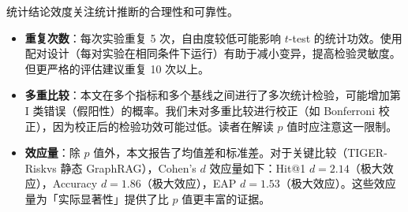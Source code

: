\documentclass[12pt,a4paper]{article}
\newcommand{\projectshort}{TIGER-Risk}
\newcommand{\term}[1]{\textbf{#1}}
\begin{document}
统计结论效度关注统计推断的合理性和可靠性。

\begin{itemize}
    \item \term{重复次数}：每次实验重复 5 次，自由度较低可能影响 $t$-test 的统计功效。使用配对设计（每对实验在相同条件下运行）有助于减小变异，提高检验灵敏度。但更严格的评估建议重复 10 次以上。
    \item \term{多重比较}：本文在多个指标和多个基线之间进行了多次统计检验，可能增加第 I 类错误（假阳性）的概率。我们未对多重比较进行校正（如 Bonferroni 校正），因为校正后的检验功效可能过低。读者在解读 $p$ 值时应注意这一限制。
    \item \term{效应量}：除 $p$ 值外，本文报告了均值差和标准差。对于关键比较（\projectshort vs 静态 GraphRAG），Cohen's $d$ 效应量如下：Hit@1 $d = 2.14$（极大效应），Accuracy $d = 1.86$（极大效应），EAP $d = 1.53$（极大效应）。这些效应量为「实际显著性」提供了比 $p$ 值更丰富的证据。
\end{itemize}
\end{document}
